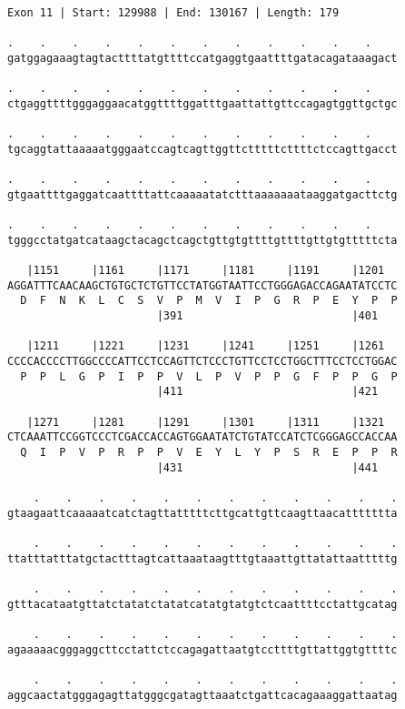 \documentclass{article}
\begin{document}
\newpage
\begin{Verbatim}
Exon 11 | Start: 129988 | End: 130167 | Length: 179
 
.    .    .    .    .    .    .    .    .    .    .    .    
gatggagaaagtagtacttttatgttttccatgaggtgaattttgatacagataaagact
  
.    .    .    .    .    .    .    .    .    .    .    .    
ctgaggttttgggaggaacatggttttggatttgaattattgttccagagtggttgctgc
  
.    .    .    .    .    .    .    .    .    .    .    .    
tgcaggtattaaaaatgggaatccagtcagttggttctttttcttttctccagttgacct
  
.    .    .    .    .    .    .    .    .    .    .    .    
gtgaattttgaggatcaattttattcaaaaatatctttaaaaaaataaggatgacttctg
  
.    .    .    .    .    .    .    .    .    .    .    .    
tgggcctatgatcataagctacagctcagctgttgtgttttgttttgttgtgtttttcta
  
   |1151     |1161     |1171     |1181     |1191     |1201  
AGGATTTCAACAAGCTGTGCTCTGTTCCTATGGTAATTCCTGGGAGACCAGAATATCCTC
  D  F  N  K  L  C  S  V  P  M  V  I  P  G  R  P  E  Y  P  P
                       |391                          |401   
  
   |1211     |1221     |1231     |1241     |1251     |1261  
CCCCACCCCTTGGCCCCATTCCTCCAGTTCTCCCTGTTCCTCCTGGCTTTCCTCCTGGAC
  P  P  L  G  P  I  P  P  V  L  P  V  P  P  G  F  P  P  G  P
                       |411                          |421   
  
   |1271     |1281     |1291     |1301     |1311     |1321  
CTCAAATTCCGGTCCCTCGACCACCAGTGGAATATCTGTATCCATCTCGGGAGCCACCAA
  Q  I  P  V  P  R  P  P  V  E  Y  L  Y  P  S  R  E  P  P  R
                       |431                          |441   
  
    .    .    .    .    .    .    .    .    .    .    .    .
gtaagaattcaaaaatcatctagttatttttcttgcattgttcaagttaacattttttta
  
    .    .    .    .    .    .    .    .    .    .    .    .
ttatttatttatgctactttagtcattaaataagtttgtaaattgttatattaatttttg
  
    .    .    .    .    .    .    .    .    .    .    .    .
gtttacataatgttatctatatctatatcatatgtatgtctcaattttcctattgcatag
  
    .    .    .    .    .    .    .    .    .    .    .    .
agaaaaacgggaggcttcctattctccagagattaatgtccttttgttattggtgttttc
  
    .    .    .    .    .    .    .    .    .    .    .    .
aggcaactatgggagagttatgggcgatagttaaatctgattcacagaaaggattaatag
\end{Verbatim}
\end{document}
